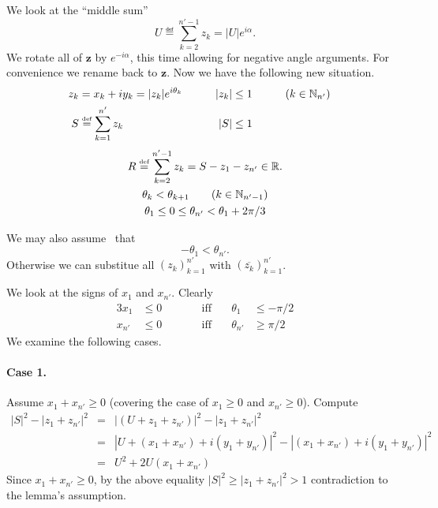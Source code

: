 \begin{thmproof}
We look at the ``middle sum''
\begin{equation*}
U \eqdef \sum_{k=2}^{n'-1} z_k = |U|e^{i\alpha}.
\end{equation*}
We rotate all of \(\mathbf{z}\) by \(e^{-i\alpha}\), this time allowing
for negative angle arguments. For convenience we rename back to \(\mathbf{z}\).
Now we have the following new situation.
\begin{alignat*}{3}
z_k &= x_k + iy_k = |z_k|e^{i\theta_k} 
  &\qquad
  |z_k| &\leq 1 
  & \qquad (k\in\mathbb{N}_{n'})  \\
S &\stackrel{\mbox{\upshape\tiny def}}{=} \sum_{k=1}^{n'} z_k 
  &\qquad
|S| &\leq 1 
  &&  \notag
\end{alignat*} %
\begin{gather}
 R \stackrel{\mbox{\upshape\tiny def}}{=} \sum_{k=2}^{n'-1} z_k = S - z_1 - z_{n'} \in \mathbb{R}. \notag \\
 \theta_k < \theta_{k+1} \qquad (k\in\mathbb{N}_{n'-1}) \notag \\
 \theta_1 \leq 0 \leq \theta_{n'} < \theta_1 + 2\pi/3 
    \label{eq:zpairlt1:thetan1}
\end{gather}


We may also assume \wlogy\ that 
\begin{equation}  \label{eq:zpairlt1:theta1n}
-\theta_1 < \theta_{n'}. 
\end{equation}
Otherwise we can substitue all 
\((z_k)_{k=1}^{n'}\)
with 
\((\overline{z_k})_{k=1}^{n'}\).

We look at the signs of \(x_1\) and \(x_{n'}\).
Clearly
\begin{alignat*}{3}
 x_1 & \leq 0     &\qquad &\textrm{iff}\quad  &\theta_1    & \leq -\pi/2 \\
 x_{n'} & \leq 0  &\qquad &\textrm{iff}\quad  &\theta_{n'} & \geq  \pi/2 
\end{alignat*}
We examine the following cases. 
\paragraph{Case 1.} Assume \(x_1 + x_{n'} \geq 0\)
(covering the case of \(x_1\geq 0\) and \(x_{n'}\geq 0\)).
Compute
\begin{eqnarray*}
|S|^2 - |z_1 + z_{n'}|^2 
&=& |(U + z_1 + z_{n'})|^2 - |z_1 + z_{n'}|^2 \\
&=& |U + (x_1 + x_{n'}) + i(y_1 + y_{n'})|^2 - 
    |(x_1 + x_{n'}) + i(y_1 + y_{n'})|^2 \\
&=& U^2 + 2U(x_1 + x_{n'})
\end{eqnarray*}
Since \(x_1 + x_{n'} \geq 0\), by the above equality
\(|S|^2 \geq |z_1 + z_{n'}|^2 > 1\) contradiction to the lemma's assumption.

\end{thmproof}
